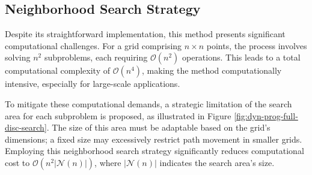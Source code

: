 \subsection{Neighborhood Search Strategy}
\label{subsec:neighborhood-search-strategy}

Despite its straightforward implementation, this method presents significant computational challenges. For a grid comprising \(n \times n\) points, the process involves solving \(n^2\) subproblems, each requiring \(\mathcal{O}(n^2)\) operations. This leads to a total computational complexity of \(\mathcal{O}(n^4)\), making the method computationally intensive, especially for large-scale applications.

To mitigate these computational demands, a strategic limitation of the search area for each subproblem is proposed, as illustrated in Figure \ref{fig:dyn-prog-full-disc-search}. The size of this area must be adaptable based on the grid's dimensions; a fixed size may excessively restrict path movement in smaller grids. Employing this neighborhood search strategy significantly reduces computational cost to \(\mathcal{O}(n^2 |\mathcal{N}(n)|)\), where \(|\mathcal{N}(n)|\) indicates the search area's size.

